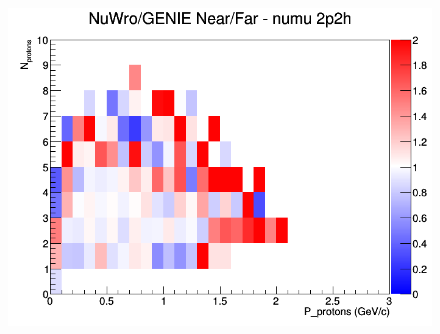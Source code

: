 \documentclass[12pt]{article}
\begin{document}
\begin{figure}[h]
\endminipage
{}
\includegraphics[width=\linewidth]{N_P/nominal/protons/ratios/2p2h_NuWro_GENIE_numu_NF_N_P.png}
\endminipage
\newline
\end{figure}
\clearpage
\end{document}
